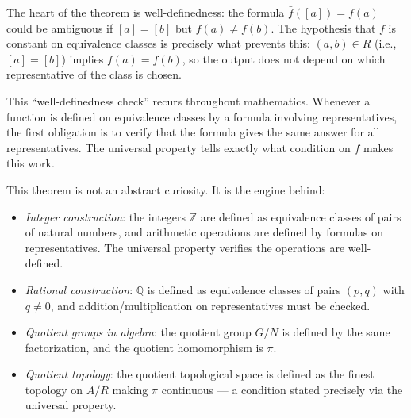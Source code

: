 \begin{remark*}
The heart of the theorem is well-definedness: the formula $\bar{f}([a]) =
f(a)$ could be ambiguous if $[a] = [b]$ but $f(a) \neq f(b)$. The hypothesis
that $f$ is constant on equivalence classes is precisely what prevents this:
$(a,b) \in R$ (i.e., $[a] = [b]$) implies $f(a) = f(b)$, so the output
does not depend on which representative of the class is chosen.

This ``well-definedness check'' recurs throughout mathematics. Whenever a
function is defined on equivalence classes by a formula involving
representatives, the first obligation is to verify that the formula gives
the same answer for all representatives. The universal property tells exactly
what condition on $f$ makes this work.
\end{remark*}

\begin{remark*}
This theorem is not an abstract curiosity. It is the engine behind:
\begin{itemize}
\item \emph{Integer construction}: the integers $\mathbb{Z}$ are defined as
equivalence classes of pairs of natural numbers, and arithmetic operations
are defined by formulas on representatives. The universal property verifies
the operations are well-defined.
\item \emph{Rational construction}: $\mathbb{Q}$ is defined as equivalence
classes of pairs $(p,q)$ with $q \neq 0$, and addition/multiplication on
representatives must be checked.
\item \emph{Quotient groups in algebra}: the quotient group $G/N$ is defined
by the same factorization, and the quotient homomorphism is $\pi$.
\item \emph{Quotient topology}: the quotient topological space is defined as
the finest topology on $A/R$ making $\pi$ continuous --- a condition stated
precisely via the universal property.
\end{itemize}
\end{remark*}
